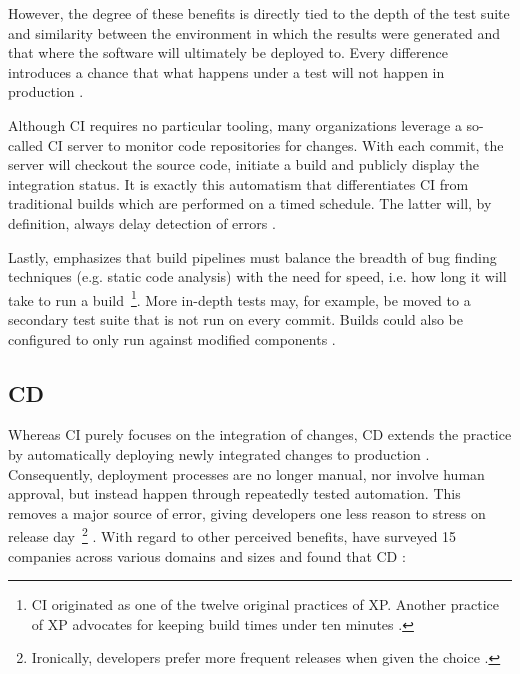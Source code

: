 However, the degree of these benefits is directly tied to the depth of the test suite and similarity between the environment in which the results were generated and that where the software will ultimately be deployed to. Every difference introduces a chance that what happens under a test will not happen in production \cite[pp.~9,~12]{fowler2006continuous}.

Although \ac{CI} requires no particular tooling, many organizations leverage a so-called \ac{CI} server to monitor code repositories for changes. With each commit, the server will checkout the source code, initiate a build and publicly display the integration status. It is exactly this automatism that differentiates \ac{CI} from traditional builds which are performed on a timed schedule. The latter will, by definition, always delay detection of errors \cite[pp.~7,~10]{fowler2006continuous}.

Lastly, \citeauthor{fowler2006continuous} emphasizes that build pipelines must balance the breadth of bug finding techniques (e.g. static code analysis) with the need for speed, i.e. how long it will take to run a build~\footnote{\ac{CI} originated as one of the twelve original practices of \ac{XP}. Another practice of \ac{XP} advocates for keeping build times under ten minutes \cite[pp.~2,~8]{fowler2006continuous}.}. More in-depth tests may, for example, be moved to a secondary test suite that is not run on every commit. Builds could also be configured to only run against modified components \cite[pp.~5,~8]{fowler2006continuous}.


\subsection{\acl{CD}}
\label{sec:continuous-deployment}

Whereas \ac{CI} purely focuses on the integration of changes, \ac{CD} extends the practice by automatically deploying newly integrated changes to production \cite[p.~64]{leppanen2015highways} \cite[p.~21]{savor2016continuous}. Consequently, deployment processes are no longer manual, nor involve human approval, but instead happen through repeatedly tested automation. This removes a major source of error, giving developers one less reason to stress on release day~\footnote{Ironically, developers prefer more frequent releases when given the choice \cite[p.~21]{savor2016continuous}.} \cite[pp.~79--80]{virmani2015understanding} \cite[p.~53]{chen2015continuous}. With regard to other perceived benefits, \citeauthor{leppanen2015highways} have surveyed 15 companies across various domains and sizes and found that \ac{CD} \cite[pp.~66--67]{leppanen2015highways}:

